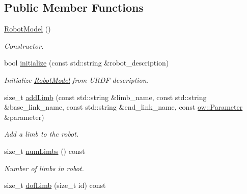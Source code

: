 \subsection*{Public Member Functions}
\begin{DoxyCompactItemize}
\item 
\hyperlink{classow__ik_1_1RobotModel_a602be41eaf537755d46e9dff73274105}{Robot\+Model} ()\hypertarget{classow__ik_1_1RobotModel_a602be41eaf537755d46e9dff73274105}{}\label{classow__ik_1_1RobotModel_a602be41eaf537755d46e9dff73274105}

\begin{DoxyCompactList}\small\item\em Constructor. \end{DoxyCompactList}\item 
bool \hyperlink{classow__ik_1_1RobotModel_a1119e63f5429b2fc9cc222914343d5d3}{initialize} (const std\+::string \&robot\+\_\+description)
\begin{DoxyCompactList}\small\item\em Initialize \hyperlink{classow__ik_1_1RobotModel}{Robot\+Model} from U\+R\+DF description. \end{DoxyCompactList}\item 
size\+\_\+t \hyperlink{classow__ik_1_1RobotModel_a6e1128fcc87875a380670d63ae73900e}{add\+Limb} (const std\+::string \&limb\+\_\+name, const std\+::string \&base\+\_\+link\+\_\+name, const std\+::string \&end\+\_\+link\+\_\+name, const \hyperlink{classow_1_1Parameter}{ow\+::\+Parameter} \&parameter)
\begin{DoxyCompactList}\small\item\em Add a limb to the robot. \end{DoxyCompactList}\item 
size\+\_\+t \hyperlink{classow__ik_1_1RobotModel_a58ea26c097cc8ce27a1c5bb5113ce3b1}{num\+Limbs} () const \hypertarget{classow__ik_1_1RobotModel_a58ea26c097cc8ce27a1c5bb5113ce3b1}{}\label{classow__ik_1_1RobotModel_a58ea26c097cc8ce27a1c5bb5113ce3b1}

\begin{DoxyCompactList}\small\item\em Number of limbs in robot. \end{DoxyCompactList}\item 
size\+\_\+t \hyperlink{classow__ik_1_1RobotModel_a7e6dc63f58bd9656cb317575a5ccd33b}{dof\+Limb} (size\+\_\+t id) const \hypertarget{classow__ik_1_1RobotModel_a7e6dc63f58bd9656cb317575a5ccd33b}{}\label{classow__ik_1_1RobotModel_a7e6dc63f58bd9656cb317575a5ccd33b}


\end{DoxyCompactItemize}
